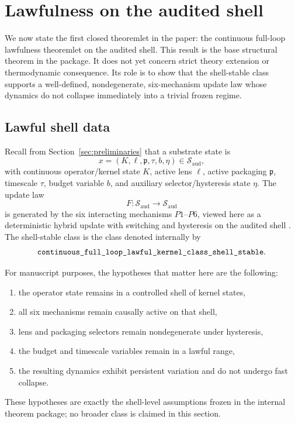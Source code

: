 \section{Lawfulness on the audited shell}\label{sec:lawfulness}

We now state the first closed theoremlet in the paper: the continuous full-loop lawfulness theoremlet on the audited shell. This result is the base structural theorem in the package. It does not yet concern strict theory extension or thermodynamic consequence. Its role is to show that the shell-stable class supports a well-defined, nondegenerate, six-mechanism update law whose dynamics do not collapse immediately into a trivial frozen regime.

\subsection{Lawful shell data}

Recall from Section~\ref{sec:preliminaries} that a substrate state is
\[
x=(K,\ell,\mathfrak{p},\tau,b,\eta)\in \mathcal{S}_{\mathrm{aud}},
\]
with continuous operator/kernel state \(K\), active lens \(\ell\), active packaging \(\mathfrak{p}\), timescale \(\tau\), budget variable \(b\), and auxiliary selector/hysteresis state \(\eta\). The update law
\[
F:\mathcal{S}_{\mathrm{aud}}\to \mathcal{S}_{\mathrm{aud}}
\]
is generated by the six interacting mechanisms \(P1\)--\(P6\), viewed here as a deterministic hybrid update with switching and hysteresis on the audited shell \cite{GoebelSanfeliceTeel2012Hybrid}. The shell-stable class is the class denoted internally by
\[
\texttt{continuous\_full\_loop\_lawful\_kernel\_class\_shell\allowbreak\_stable}.
\]

For manuscript purposes, the hypotheses that matter here are the following:
\begin{enumerate}
    \item the operator state remains in a controlled shell of kernel states,
    \item all six mechanisms remain causally active on that shell,
    \item lens and packaging selectors remain nondegenerate under hysteresis,
    \item the budget and timescale variables remain in a lawful range,
    \item the resulting dynamics exhibit persistent variation and do not undergo fast collapse.
\end{enumerate}
These hypotheses are exactly the shell-level assumptions frozen in the internal theorem package; no broader class is claimed in this section.

